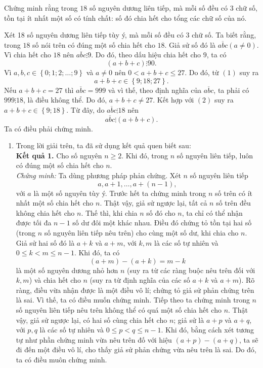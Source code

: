 \begin{bt}%
Chứng minh rằng trong $18$ số nguyên dương liên tiếp, mà mỗi số đều có $3$ chữ số, tồn tại ít nhất một số có tính chất: số đó chia hết cho tổng các chữ số của nó.
\loigiai
{Xét 18 số nguyên dương liên tiếp tùy ý, mà mỗi số đều có $3$ chữ số.
	Ta biết rằng, trong $18$ số nói trên có đúng một số chia hết cho $18$. Giả sử số đó là $\overline{abc}(a\neq0).$
	Vì chia hết cho $18$ nên $\overline{abc}\vdots9$. Do đó, theo dấu hiệu chia hết cho $9$, ta có
 \[ (a+b+c) \vdots 90. \tag{1}\]
 Vì $a,b,c\in\left\lbrace 0;1;2;\dots;9\right\rbrace $ và $a\neq0$ nên $0<a+b+c\leqslant 27$. Do đó, từ $(1)$ suy ra
 \[ a+b+c\in \left\lbrace 9; 18; 27\right\rbrace. \tag{2}\]
 Nếu $a+b+c=27$ thì $\overline{abc}=999$ và vì thế, theo định nghĩa của $\overline{abc}$, ta phải có $999\vdots 18$, là điều không thể. Do đó, $a+b+c\neq27$. Kết hợp với $(2)$ suy ra $a+b+c\in \left\lbrace 9;18 \right\rbrace $. Từ đây, do $\overline{abc} \vdots 18$ nên
 \[\overline{abc} \vdots (a+b+c).\]
 Ta có điều phải chứng minh.
\begin{nx}
	\hfil
	\begin{enumerate}[1.]
		\item Trong lời giải trên, ta đã sử dụng kết quả quen biết sau:\\
		\textbf{Kết quả 1.} Cho số nguyên $n\geqslant 2$. Khi đó, trong $n$ số nguyên liên tiếp, luôn có đúng một số chia hết cho $n$.
	\\ \textit{Chứng minh:} Ta dùng phương pháp phản chứng. Xét $n$ số nguyên liên tiếp 
	$$a,a+1,\dots, a+(n-1),$$
	với $a$ là một số nguyên tùy ý.
		 Trước hết ta chứng minh trong $n$ số trên có ít nhất một số chia hết cho $n$.
		 Thật vậy, giả sử ngược lại, tất cả $n$ số trên đều không chia hết cho $n$. Thế thì, khi chia $n$ số đó cho $n$, ta chỉ có thể nhận được tối đa $n-1$ số dư đôi một khác nhau. Điều đó chứng tỏ tồn tại hai số (trong $n$ số nguyên liên tiếp nêu trên) cho cùng một số dư, khi chia cho $n$. Giả sử hai số đó là $a+k$ và $a+m$, với $k,m$ là các số tự nhiên và $0\leqslant k<m\leqslant n-1$. Khi đó, ta có $$(a+m)-(a+k)=m-k$$
		là một số nguyên dương nhỏ hơn $n$ (suy ra từ các ràng buộc nêu trên đối với $k,m$) và chia hết cho $n$ (suy ra từ định nghĩa của các số $a+k$ và $a+m$). Rõ ràng, điều vừa nhận được là một điều vô lí; chứng tỏ giả sử phản chứng trên là sai. Vì thế, ta có điều muốn chứng minh.
	Tiếp theo ta chứng minh trong $n$ số nguyên liên tiếp nêu trên không thể có quá một số chia hết cho $n$.
		 Thật vậy, giả sử ngược lại, có hai số cùng chia hết cho $n$; giả sử là $a+p$ và $a+q$, với $p,q$ là các số tự nhiên và $0\leqslant p<q \leqslant n-1 $. Khi đó, bằng cách xét tương tự như phần chứng minh vừa nêu trên đố với hiệu $(a+p)-(a+q)$, ta sẽ đi đến một điều vô lí, cho thấy giả sử phản chứng vừa nêu trên là sai. Do đó, ta có điều muôn chứng minh.

\end{enumerate}
\end{nx}}
\end{bt}
